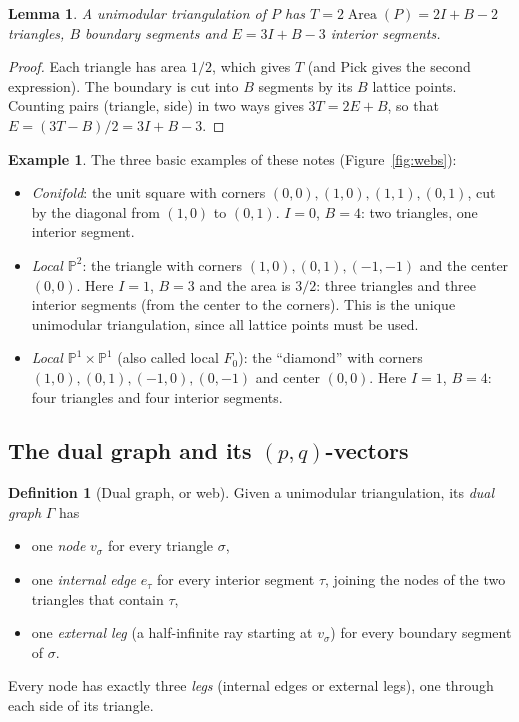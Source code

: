 \documentclass[11pt]{article}
\theoremstyle{plain}
\newtheorem{lemma}[theorem]{Lemma}
\theoremstyle{definition}
\newtheorem{definition}[theorem]{Definition}
\newtheorem{example}[theorem]{Example}
\theoremstyle{remark}
\newcommand{\PP}{\mathbb{P}}
\begin{document}
\begin{lemma}\label{lem:counting}
A unimodular triangulation of $P$ has $T=2\operatorname{Area}(P)=2I+B-2$ triangles, $B$ boundary
segments and $E=3I+B-3$ interior segments.
\end{lemma}
\begin{proof}
Each triangle has area $1/2$, which gives $T$ (and Pick gives the second expression). The
boundary is cut into $B$ segments by its $B$ lattice points. Counting pairs (triangle, side) in
two ways gives $3T=2E+B$, so that $E=(3T-B)/2=3I+B-3$.
\end{proof}

\begin{example}\label{ex:three}
The three basic examples of these notes (Figure~\ref{fig:webs}):
\begin{itemize}
\item \textit{Conifold}: the unit square with corners $(0,0),(1,0),(1,1),(0,1)$, cut by the
diagonal from $(1,0)$ to $(0,1)$. $I=0$, $B=4$: two triangles, one interior segment.
\item \textit{Local $\PP^2$}: the triangle with corners $(1,0),(0,1),(-1,-1)$ and the center
$(0,0)$. Here $I=1$, $B=3$ and the area is $3/2$: three triangles and three interior segments (from the center
to the corners). This is the unique unimodular triangulation, since all lattice points must be
used.
\item \textit{Local $\PP^1\times\PP^1$} (also called local $F_0$): the ``diamond'' with corners
$(1,0),(0,1),(-1,0),(0,-1)$ and center $(0,0)$. Here $I=1$, $B=4$: four triangles and four interior
segments.
\end{itemize}
\end{example}

\subsection{The dual graph and its \texorpdfstring{$(p,q)$}{(p,q)}-vectors}\label{ssec:dual}

\begin{definition}[Dual graph, or web]\label{def:dual}
Given a unimodular triangulation, its \textit{dual graph} $\Gamma$ has
\begin{itemize}
\item one \textit{node} $v_\sigma$ for every triangle $\sigma$,
\item one \textit{internal edge} $e_\tau$ for every interior segment $\tau$, joining the nodes of
the two triangles that contain $\tau$,
\item one \textit{external leg} (a half-infinite ray starting at $v_\sigma$) for every boundary
segment of $\sigma$.
\end{itemize}
Every node has exactly three \textit{legs} (internal edges or external legs), one through each
side of its triangle.
\end{definition}
\end{document}
